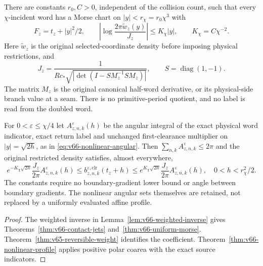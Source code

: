 \begin{leadtheorem}
\label{thm:intro-v66-profile}
There are constants $r_0,C>0$, independent of the collision count,
such that every $\chi$-incident word has a Morse chart on
$|y|<r_\chi=r_0\chi^3$ with
\[
 F_z=t_z+|y|^2/2,\qquad
 \left|\log\frac{2\pi\widetilde w_z(y)}{J_z}\right|
          \le K_\chi|y|,\qquad K_\chi=C\chi^{-2}.
\]
Here $\widetilde w_z$ is the original selected-coordinate density
before imposing physical restrictions, and
\[
 J_z=\frac{1}{R c_*\sqrt{|\det(I-SM_z^{-1}SM_z)|}},
       \qquad S=\operatorname{diag}(1,-1).
\]
The matrix $M_z$ is the original canonical half-word derivative,
or its physical-side branch value at a seam. There is no primitive-period
quotient, and no label is read from the doubled word.

For $0<\varepsilon\le\chi/4$ let
$A_{z,n,k}^{\varepsilon}(h)$ be the angular integral of the exact
physical word indicator, exact return label and unchanged first-clearance
multiplier on $|y|=\sqrt{2h}$, as in
\eqref{eq:v66-nonlinear-angular}. Then $\sum_{n,k}A_{z,n,k}^{\varepsilon}\le2\pi$
and the original restricted density satisfies, almost everywhere,
\[
 e^{-K_\chi\sqrt{2h}}\frac{J_z}{2\pi}A_{z,n,k}^{\varepsilon}(h)
 \le b_{z,n,k}^{\varepsilon,\mathrm{clr}}(t_z+h)
 \le e^{K_\chi\sqrt{2h}}\frac{J_z}{2\pi}A_{z,n,k}^{\varepsilon}(h),
 \quad 0<h<r_\chi^2/2.
\]
The constants require no boundary-gradient lower bound or angle between
boundary gradients. The nonlinear angular sets themselves are retained,
not replaced by a uniformly evaluated affine profile.
\end{leadtheorem}
\begin{proof}
The weighted inverse in Lemma~\ref{lem:v66-weighted-inverse} gives
Theorems~\ref{thm:v66-contact-jets} and~\ref{thm:v66-uniform-morse}.
Theorem~\ref{thm:v65-reversible-weight} identifies the coefficient.
Theorem~\ref{thm:v66-nonlinear-profile} applies positive polar coarea
with the exact source indicators.
\end{proof}

